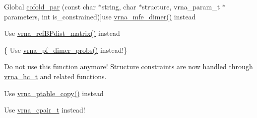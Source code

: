 \begin{DoxyRefList}
%
Global \mbox{\hyperlink{group__mfe__cofold_ga7612cfeeb1b793f1e4179b1eb53df1f3}{cofold\+\_\+par}} (const char $\ast$string, char $\ast$structure, vrna\+\_\+param\+\_\+t $\ast$parameters, int is\+\_\+constrained)]use \mbox{\hyperlink{group__mfe__cofold_gaab22d10c1190f205f16a77cab9d5d3ee}{vrna\+\_\+mfe\+\_\+dimer()}} instead 
\item[\label{deprecated__deprecated000146}%
\Hypertarget{deprecated__deprecated000146}%
Global \mbox{\hyperlink{group__struct__utils_gadd463184355d0803b6ee6e09f29182f2}{compute\+\_\+\+B\+Pdifferences}} (short $\ast$pt1, short $\ast$pt2, unsigned int turn)]Use \mbox{\hyperlink{group__struct__utils_ga5a27bd058183170afd4716f5b8ff511a}{vrna\+\_\+ref\+B\+Pdist\+\_\+matrix()}} instead  
\item[\label{deprecated__deprecated000121}%
\Hypertarget{deprecated__deprecated000121}%
Global \mbox{\hyperlink{part__func__co_8h_a94c19120130e66a667a10a3c8598550c}{compute\+\_\+probabilities}} (double F\+AB, double F\+EA, double F\+EB, vrna\+\_\+ep\+\_\+t $\ast$pr\+AB, vrna\+\_\+ep\+\_\+t $\ast$prA, vrna\+\_\+ep\+\_\+t $\ast$prB, int Alength)]\{ Use \mbox{\hyperlink{group__pf__cofold_gaa1e39e73afb51fbaf4ae38f0c066c46b}{vrna\+\_\+pf\+\_\+dimer\+\_\+probs()}} instead!\} 
\item[\label{deprecated__deprecated000046}%
\Hypertarget{deprecated__deprecated000046}%
Global \mbox{\hyperlink{constraints__hard_8h_a36c3a6c3218b041f992052767bc74549}{constrain\+\_\+ptypes}} (const char $\ast$constraint, unsigned int length, char $\ast$ptype, int $\ast$\+BP, int min\+\_\+loop\+\_\+size, unsigned int idx\+\_\+type)]Do not use this function anymore! Structure constraints are now handled through \mbox{\hyperlink{group__hard__constraints_gac7e4c4f8abe3163a68110c5bff24e01d}{vrna\+\_\+hc\+\_\+t}} and related functions. 
\item[\label{deprecated__deprecated000141}%
\Hypertarget{deprecated__deprecated000141}%
Global \mbox{\hyperlink{group__struct__utils_gafeaa6d68eef3a99d0a7aa08aa91c6601}{copy\+\_\+pair\+\_\+table}} (const short $\ast$pt)]Use \mbox{\hyperlink{group__struct__utils_ga2daefbbd6d9f8803731651882f54332d}{vrna\+\_\+ptable\+\_\+copy()}} instead 
\item[\label{deprecated__deprecated000049}%
\Hypertarget{deprecated__deprecated000049}%
Global \mbox{\hyperlink{group__data__structures_ga8412f116a2eb07b59ade9e14ca7c5ef1}{cpair}} ]Use \mbox{\hyperlink{group__data__structures_gae4fc91141cc69c6d8eaf1332cb991ecc}{vrna\+\_\+cpair\+\_\+t}} instead!  

\end{DoxyRefList}
